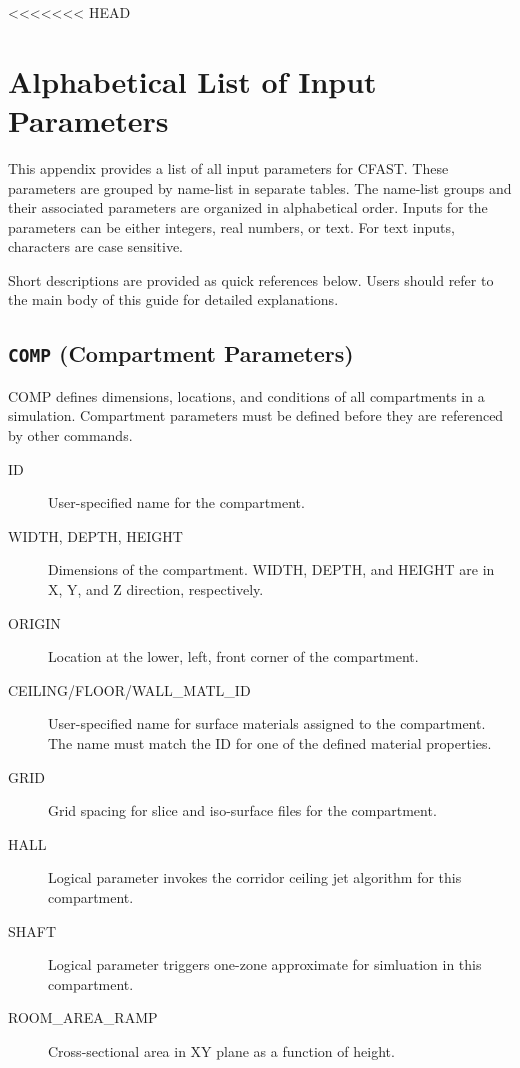 <<<<<<< HEAD
\chapter{Alphabetical List of Input Parameters} \label{sec:CFAST_Keywords}


This appendix provides a list of all input parameters for CFAST. These parameters are grouped by name-list in separate tables. The name-list groups and their associated parameters are organized in alphabetical order. Inputs for the parameters can be either integers, real numbers, or text. For text inputs, characters are case sensitive. 

Short descriptions are provided as quick references below. Users should refer to the main body of this guide for detailed explanations.


\section{\texorpdfstring{{\tt COMP}}{COMP} (Compartment Parameters)}

COMP defines dimensions, locations, and conditions of all compartments in a simulation. Compartment parameters must be defined before they are referenced by other commands.

\begin{adjustwidth}{1cm}{0cm}
\begin{description}
  \item[ID] User-specified name for the compartment.
  \item[WIDTH, DEPTH, HEIGHT] Dimensions of the compartment. WIDTH, DEPTH, and HEIGHT are in X, Y, and Z direction, respectively.
  \item[ORIGIN] Location at the lower, left, front corner of the compartment.
  \item[CEILING/FLOOR/WALL\_MATL\_ID] User-specified name for surface materials assigned to the compartment. The name must match the ID for one of the defined material properties.
  \item[GRID] Grid spacing for slice and iso-surface files for the compartment.
  \item[HALL] Logical parameter invokes the corridor ceiling jet algorithm for this compartment.
  \item[SHAFT] Logical parameter triggers one-zone approximate for simluation in this compartment.
  \item[ROOM\_AREA\_RAMP] Cross-sectional area in XY plane as a function of height.
\end{description}
\end{adjustwidth}

